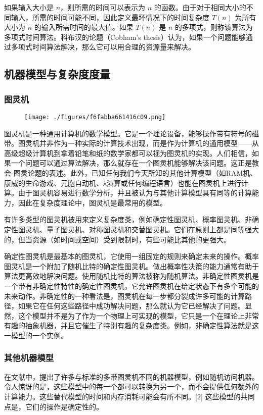 如果输入大小是 \(n\)，则所需的时间可以表示为 \(n\) 的函数。由于对于相同大小的不同输入，所需的时间可能不同，因此定义最坏情况下的时间复杂度 \(T(n)\) 为所有大小为 \(n\) 的输入所需时间的最大值。如果 \(T(n)\) 是 \(n\) 的多项式，则称该算法为多项式时间算法。科布汉的论题（Cobham's thesis）认为，如果一个问题能够通过多项式时间算法解决，那么它可以用合理的资源量来解决。
\subsection{机器模型与复杂度度量} 
\subsubsection{图灵机}
\begin{figure}[ht]
\centering
\texttt{[image: ./figures/f6fabba661416c09.png]}
\caption{} \label{fig_JSFZ_3}
\end{figure}
图灵机是一种通用计算机的数学模型。它是一个理论设备，能够操作带有符号的磁带。图灵机并非作为一种实际的计算技术出现，而是作为计算机的通用模型——从高级超级计算机到拿着铅笔和纸的数学家都可以视为图灵机的实现。人们相信，如果一个问题可以通过算法解决，那么就存在一个图灵机能够解决该问题。这正是教会-图灵论题的表述。此外，已知任何我们今天所知的其他计算模型（如RAM机、康威的生命游戏、元胞自动机、λ演算或任何编程语言）也能在图灵机上进行计算。由于图灵机容易进行数学分析，并且被认为与其他计算模型具有同等的计算能力，因此在复杂度理论中，图灵机是最常用的模型。

有许多类型的图灵机被用来定义复杂度类，例如确定性图灵机、概率图灵机、非确定性图灵机、量子图灵机、对称图灵机和交替图灵机。它们在原则上都是同等强大的，但当资源（如时间或空间）受到限制时，有些可能比其他的更强大。

确定性图灵机是最基本的图灵机，它使用一组固定的规则来确定未来的操作。概率图灵机是一个附加了随机比特的确定性图灵机。做出概率性决策的能力通常有助于算法更高效地解决问题。使用随机比特的算法被称为随机算法。非确定性图灵机是一个带有非确定性特性的确定性图灵机，它允许图灵机在给定状态下有多个可能的未来动作。非确定性的一种看法是，图灵机在每一步都分裂成许多可能的计算路径，如果它在任何这些路径中成功解决问题，那么就认为它已经解决了问题。显然，这个模型并不是为了作为一个物理上可实现的模型，它只是一个在理论上非常有趣的抽象机器，并且它催生了特别有趣的复杂度类。例如，非确定性算法就是这一模型的一个实例。
\subsubsection{其他机器模型}  
在文献中，提出了许多与标准的多带图灵机不同的机器模型，例如随机访问机器。令人惊讶的是，这些模型中的每一个都可以转换为另一个，而不会提供任何额外的计算能力。这些替代模型的时间和内存消耗可能会有所不同。[2] 这些模型的共同点是，它们的操作是确定性的。

